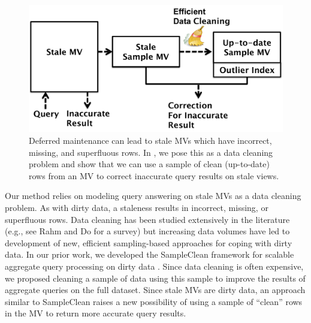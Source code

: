 
\begin{figure}[t] \vspace{-2em}
\centering
 \includegraphics[scale=0.25]{figs/sys-arch.pdf} \vspace{-.25em}
 \caption{Deferred maintenance can lead to stale MVs which have incorrect, missing, and superfluous rows. In \svc, we pose this as a data cleaning problem and show that we can use a sample of clean (up-to-date) rows from an MV to correct inaccurate query results on stale views. \label{sys-arch}}\vspace{-1.75em}
\end{figure}

Our method relies on modeling query answering on stale MVs as a data cleaning problem.
As with dirty data, a staleness results in incorrect, missing, or superfluous rows.
Data cleaning has been studied extensively in the literature (e.g., see Rahm and Do for a survey\cite{rahm2000data}) but increasing data volumes have led to development of new, efficient sampling-based approaches for coping with dirty data.   
In our prior work, we developed the SampleClean framework for scalable aggregate query processing on dirty data \cite{wang1999sample}.
Since data cleaning is often expensive, we proposed cleaning a sample of data using this sample to improve the results of aggregate queries on the full dataset.
Since stale MVs are dirty data, an approach similar to SampleClean raises a new possibility of using a sample of ``clean'' rows in the MV to return more accurate query results.

